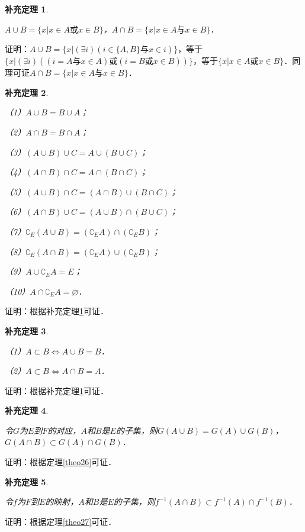 \documentclass[12pt, a4paper, oneside]{book}
\newtheorem{cor}{补充定理}
\begin{document}
			\begin{cor}\label{cor99}
				\hfill\par
				$A\cup B=\{x|x\in A\text{或}x\in B\}$，$A\cap B=\{x|x\in A\text{与}x\in B\}$．
			\end{cor}
			证明：$A\cup B=\{x|(\exists i)(i\in \{A, B\}\text{与}x\in i)\}$，等于$\{x|(\exists i)((i=A\text{与}x\in A)\text{或}(i=B\text{或}x\in B))\}$，等于$\{x| x\in A\text{或}x\in B\}$．同理可证$A\cap B=\{x|x\in A\text{与}x\in B\}$．			
			
			\begin{cor}\label{cor100}
				\hfill\par
				（1）$A\cup B=B\cup A$；
				\par
				（2）$A\cap B=B\cap A$；
				\par
				（3）$(A\cup B)\cup C=A\cup (B\cup C)$；
				\par
				（4）$(A\cap B)\cap C=A\cap (B\cap C)$；
				\par
				（5）$(A\cup B)\cap C=(A\cap B)\cup (B\cap C)$；
				\par
				（6）$(A\cap B)\cup C=(A\cup B)\cap (B\cup C)$；
				\par
				（7）$\complement_E(A\cup B)=(\complement_EA)\cap (\complement_EB)$；
				\par
				（8）$\complement_E(A\cap B)=(\complement_EA)\cup (\complement_EB)$；
				\par
				（9）$A\cup \complement_EA=E$；
				\par
				（10）$A\cap \complement_EA=\varnothing$．
			\end{cor}
			证明：根据补充定理\ref{cor99}可证．
						
			\begin{cor}\label{cor101}
				\hfill\par
				（1）$A\subset B\Leftrightarrow A\cup B=B$．
				\par
				（2）$A\subset B\Leftrightarrow A\cap B=A$．
			\end{cor}
			证明：根据补充定理\ref{cor99}可证．
			
			\begin{cor}\label{cor102}
				\hfill\par
				令$G$为$E$到$F$的对应，$A$和$B$是$E$的子集，则$G(A\cup B)=G(A)\cup G(B)$，$G(A\cap B)\subset G(A)\cap G(B)$．
			\end{cor}
			证明：根据定理\ref{theo26}可证．
						
			\begin{cor}\label{cor103}
				\hfill\par
				令$f$为$F$到$E$的映射，$A$和$B$是$E$的子集，则$f^{-1}(A\cap B)\subset f^{-1}(A)\cap f^{-1}(B)$．
			\end{cor}
			证明：根据定理\ref{theo27}可证．
			
\end{document}
